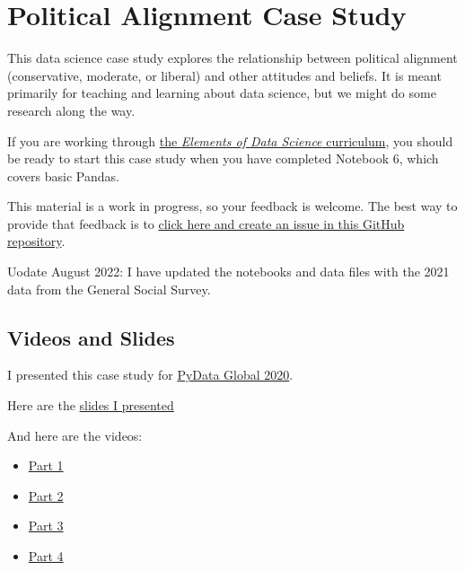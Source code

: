 \hypertarget{political-alignment-case-study}{%
\section{Political Alignment Case
Study}\label{political-alignment-case-study}}

This data science case study explores the relationship between political
alignment (conservative, moderate, or liberal) and other attitudes and
beliefs. It is meant primarily for teaching and learning about data
science, but we might do some research along the way.

If you are working through
\href{https://allendowney.github.io/ElementsOfDataScience/}{the
\emph{Elements of Data Science} curriculum}, you should be ready to
start this case study when you have completed Notebook 6, which covers
basic Pandas.

This material is a work in progress, so your feedback is welcome. The
best way to provide that feedback is to
\href{https://github.com/AllenDowney/PoliticalAlignmentCaseStudy/issues}{click
here and create an issue in this GitHub repository}.

Uodate August 2022: I have updated the notebooks and data files with the
2021 data from the General Social Survey.

\hypertarget{videos-and-slides}{%
\subsection{Videos and Slides}\label{videos-and-slides}}

I presented this case study for
\href{https://global.pydata.org/talks/363}{PyData Global 2020}.

Here are the
\href{https://docs.google.com/presentation/d/e/2PACX-1vSqifcdVGQmMoLDNlmbnugZ58jieItA_weGEF9oRsQCAa6iICLmehevGRzINYVv0tCGqcSTvuIQOSJo/pub}{slides
I presented}

And here are the videos:

\begin{itemize}
\item
  \href{https://www.youtube.com/watch?v=6Bg7v5EGiWY}{Part 1}
\item
  \href{https://www.youtube.com/watch?v=y8A3bKjpJe4}{Part 2}
\item
  \href{https://www.youtube.com/watch?v=vfuXyXXSNtM}{Part 3}
\item
  \href{https://www.youtube.com/watch?v=XFPi-AUiJSo}{Part 4}
\end{itemize}

